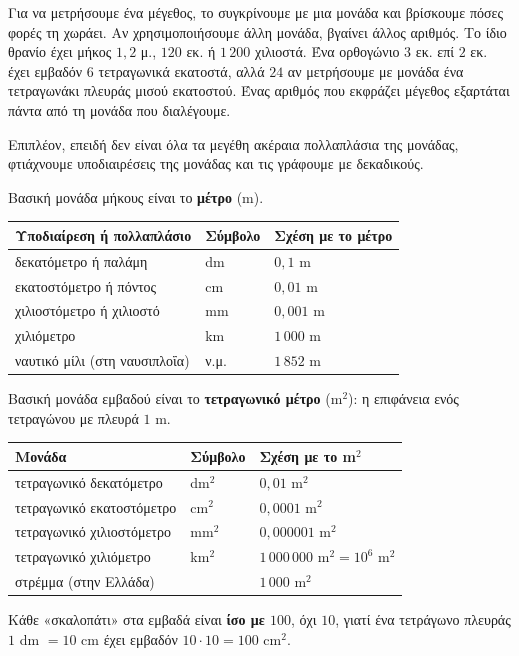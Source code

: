 

Για να μετρήσουμε ένα μέγεθος, το συγκρίνουμε με μια μονάδα και βρίσκουμε πόσες φορές τη χωράει. Αν χρησιμοποιήσουμε άλλη μονάδα, βγαίνει άλλος αριθμός. Το ίδιο θρανίο έχει μήκος $1{,}2$ μ., $120$ εκ. ή $1\,200$ χιλιοστά. Ένα ορθογώνιο $3$ εκ. επί $2$ εκ. έχει εμβαδόν $6$ τετραγωνικά εκατοστά, αλλά $24$ αν μετρήσουμε με μονάδα ένα τετραγωνάκι πλευράς μισού εκατοστού. Ένας αριθμός που εκφράζει μέγεθος εξαρτάται πάντα από τη μονάδα που διαλέγουμε.

Επιπλέον, επειδή δεν είναι όλα τα μεγέθη ακέραια πολλαπλάσια της μονάδας, φτιάχνουμε υποδιαιρέσεις της μονάδας και τις γράφουμε με δεκαδικούς.


Βασική μονάδα μήκους είναι το \textbf{μέτρο} (m).
\begin{center}
\renewcommand{\arraystretch}{1.4}
\begin{tabular}{@{}lll@{}}
\toprule
\textbf{Υποδιαίρεση ή πολλαπλάσιο} & \textbf{Σύμβολο} & \textbf{Σχέση με το μέτρο}\\
\midrule
δεκατόμετρο ή παλάμη & dm & $0{,}1$ m\\
εκατοστόμετρο ή πόντος & cm & $0{,}01$ m\\
χιλιοστόμετρο ή χιλιοστό & mm & $0{,}001$ m\\
χιλιόμετρο & km & $1\,000$ m\\
ναυτικό μίλι (στη ναυσιπλοΐα) & ν.μ. & $1\,852$ m\\
\bottomrule
\end{tabular}
\end{center}


Βασική μονάδα εμβαδού είναι το \textbf{τετραγωνικό μέτρο} (m$^2$): η επιφάνεια ενός τετραγώνου με πλευρά $1$ m.
\begin{center}
\renewcommand{\arraystretch}{1.4}
\begin{tabular}{@{}lll@{}}
\toprule
\textbf{Μονάδα} & \textbf{Σύμβολο} & \textbf{Σχέση με το m$^2$}\\
\midrule
τετραγωνικό δεκατόμετρο & dm$^2$ & $0{,}01$ m$^2$\\
τετραγωνικό εκατοστόμετρο & cm$^2$ & $0{,}0001$ m$^2$\\
τετραγωνικό χιλιοστόμετρο & mm$^2$ & $0{,}000001$ m$^2$\\
τετραγωνικό χιλιόμετρο & km$^2$ & $1\,000\,000$ m$^2=10^6$ m$^2$\\
στρέμμα (στην Ελλάδα) & & $1\,000$ m$^2$\\
\bottomrule
\end{tabular}
\end{center}
Κάθε «σκαλοπάτι» στα εμβαδά είναι \textbf{ίσο με $100$}, όχι $10$, γιατί ένα τετράγωνο πλευράς $1$ dm $=10$ cm έχει εμβαδόν $10\cdot10=100$ cm$^2$.

